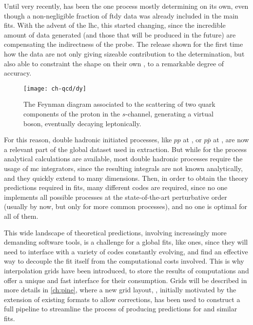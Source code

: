 
Until very recently, \dis has been the one process mostly determining \pdfs
on its own, even though a non-negligible fraction of \acrfull{ftdy} data was
already included in the main fits.
%
With the advent of the \acrfull{lhc}, this started changing, since the
incredible amount of data generated (and those that will be produced in the
future) are compensating the indirectness of the probe.
%
The  release shown for the first time how the \lhc data are not
only giving sizeable contribution to the \pdfs determination, but also able
to constraint the \pdfs shape on their own \cite{Ball:2021leu}, to a
remarkable degree of accuracy.

\begin{figure}
	\centering
	\texttt{[image: ch-qcd/dy]}
	\caption{
		The \lo Feynman diagram associated to the scattering of two quark
		components of the proton in the $s$-channel, generating a virtual \ew
		boson, eventually decaying leptonically.
	}
	\label{fig:qcd/dy}
\end{figure}

For this reason, double hadronic initiated processes, like $pp$ at \lhc, or
$p\bar{p}$ at \tevatron, are now a relevant part of the global \qcd dataset
used in \pdfs extraction.
%
But while for the \dis process analytical calculations are available, most
double hadronic processes require the usage of \acrfull{mc} integrators, since
the resulting integrals are not known analytically, and they quickly extend to
many dimensions.
%
Then, in order to obtain the theory predictions required in \pdf fits, many
different codes are required, since no one implements all possible processes at
the state-of-the-art perturbative order (usually \nnlo by now, but only for
more common processes), and no one is optimal for all of them.

This wide landscape of theoretical predictions, involving increasingly more
demanding software tools, is a challenge for a global \qcd fits, like \pdf
ones, since they will need to interface with a variety of codes constantly
evolving, and find an effective way to decouple the fit itself from the
computational costs involved.
%
This is why interpolation grids have been introduced, to store the results of
\mc computations and offer a unique and fast interface for their consumption.
Grids will be described in more details in \cref{ch:pine}, where a new grid
layout, \pineappl \cite{Carrazza:2020gss}, initially motivated by the extension
of existing formats to allow \ew corrections, has been used to construct a full
pipeline to streamline the process of producing predictions for \pdf and
similar fits.


